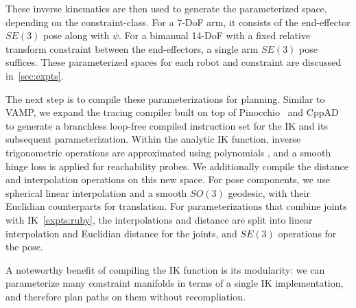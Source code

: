 \documentclass[letterpaper, 10 pt, conference]{ieeeconf}
\begin{document}
These inverse kinematics are then used to generate the parameterized space, depending on the constraint-class. For a 7-DoF arm, it consists of the end-effector $SE(3)$ pose along with $\psi$. For a bimanual 14-DoF with a fixed relative transform constraint between the end-effectors, a single arm $SE(3)$ pose suffices. These parameterized spaces for each robot and constraint are discussed in~\cref{sec:expts}. 

The next step is to compile these parameterizations for planning. Similar to VAMP, we expand the tracing compiler built on top of Pinocchio~\cite{carpentier-sii19} and CppAD~\cite{cppad} to generate a branchless loop-free compiled instruction set for the IK and its subsequent parameterization.
Within the analytic IK function, inverse trigonometric operations are approximated using polynomials , and a smooth hinge loss is applied for reachability probes. We additionally compile the distance and interpolation operations on this new space. For pose components, we use spherical linear interpolation and a smooth $SO(3)$ geodesic, with their Euclidian counterparts for translation. For parameterizations that combine joints with IK~\cref{expts:ruby}, the interpolations and distance are split into linear interpolation and Euclidian distance for the joints, and $SE(3)$ operations for the pose.

A noteworthy benefit of compiling the IK function is its modularity: we can parameterize many constraint manifolds in terms of a single IK implementation, and therefore plan paths on them without recompliation.



\end{document}

